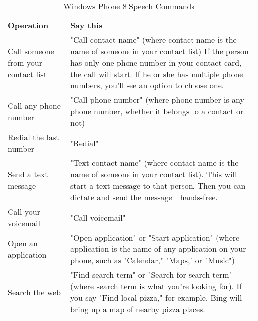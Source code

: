 \begin{table}[htbp]
  \centering
  \caption{Windows Phone 8 Speech Commands}\label{tab:w8sc}
  \renewcommand{\arraystretch}{1.2}
    \begin{tabularx}{\textwidth}{p{3cm}|X}
    \rowcolor{mygray}
    \textbf{Operation}  & \textbf{Say this} \\
    Call someone from your contact list & "Call contact name" 
           (where contact name is the name of someone in your contact list) 
           If the person has only one phone number in your contact card, the call will start. If he or she has multiple phone numbers, you'll see an option to choose one. \\ \hline
    Call any phone number & "Call phone number" (where phone number is any phone number, whether it belongs to a contact or not)\\ \hline
     Redial the last number & "Redial" \\ \hline
    Send a text message & "Text contact name" (where contact name is the name of someone in your contact list). This will start a text message to that person. Then you can dictate and send the message—hands-free. \\ \hline
    Call your voicemail & "Call voicemail" \\ \hline
    Open an application & "Open application" or "Start application" (where application is the name of any application on your phone, such as "Calendar," "Maps," or "Music") \\ \hline
    Search the web & "Find search term" or "Search for search term" (where search term is what you're looking for). If you say "Find local pizza," for example, Bing will bring up a map of nearby pizza places. \\ \end{tabularx}
\end{table}%
